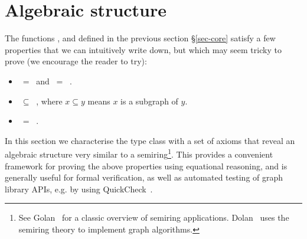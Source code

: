 \section{Algebraic structure}\label{sec-algebra}

The functions ,  and  defined in the previous
section \S\ref{sec-core} satisfy a few properties that we can intuitively write down,
but which may seem tricky to prove (we encourage the reader to try):
\begin{itemize}
    \item {} $\ =\ $  and  $\ =\ $ .
    \item {} $\ \subseteq\ $ , where $x \subseteq y$ means
    $x$ is a subgraph of $y$.
    \item {} $\ =\ $ .
\end{itemize}

In this section we characterise the  type class with a set of
axioms that reveal an algebraic structure very similar to a semiring\footnote{
See Golan~\citeyear{1999_semirings_golan} for a classic overview of semiring
applications. Dolan~\citeyear{2013_semirings_dolan} uses the semiring theory
to implement graph algorithms.}.
This provides a convenient framework for proving the above properties using equational
reasoning, and is generally useful for formal verification, as well as automated testing
of graph library APIs, e.g. by using QuickCheck~\cite{2011_quickcheck_claessen}.

